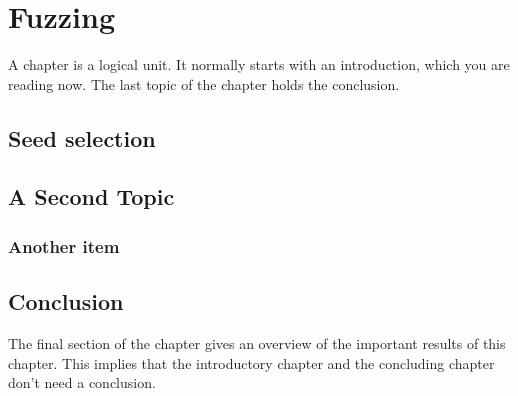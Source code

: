 \chapter{Fuzzing}
\label{cha:1}
A chapter is a logical unit. It normally starts with an introduction, which
you are reading now. The last topic of the chapter holds the conclusion.

%

\section{Seed selection}

\section{A Second Topic}


\subsection{Another item}


\section{Conclusion}
The final section of the chapter gives an overview of the important results
of this chapter. This implies that the introductory chapter and the
concluding chapter don't need a conclusion.



